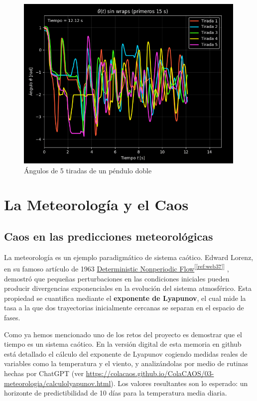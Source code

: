 \documentclass[
  10pt,
  a4paper,
  DIV=11,
  numbers=noendperiod,
  open=any]{scrreprt}
\numberwithin{equation}{chapter}
\numberwithin{equation}{section}
\renewcommand{\[}{\begin{equation}}
\renewcommand{\]}{\end{equation}}
\newcommand{\refweb}[3]{%
  \href{#1}{#2}\textsuperscript{[\ref{ref:#3}]}%
}
\begin{document}
\begin{figure}[h]
  \centering
  \includegraphics[width=0.99\textwidth]{02-pendulo-doble/theta_vs_time_doble.png}
  \caption{Ángulos de 5 tiradas de un péndulo doble}
\end{figure}


\part{La Meteorología y el Caos}

\chapter{Caos en las predicciones
meteorológicas}\label{caos-en-las-predicciones-meteoroluxf3gicas}

La meteorología es un ejemplo paradigmático de sistema caótico. Edward
Lorenz, en su famoso artículo de 1963 \refweb{https://journals.ametsoc.org/view/journals/atsc/20/2/1520-0469_1963_020_0130_dnf_2_0_co_2.xml}{Deterministic Nonperiodic Flow}{web37}, demostró que pequeñas
perturbaciones en las condiciones iniciales pueden producir divergencias
exponenciales en la evolución del sistema atmosférico.
Esta propiedad se cuantifica mediante el \textbf{exponente de Lyapunov},
el cual mide la tasa a la que dos trayectorias inicialmente cercanas se
separan en el espacio de fases.

Como ya hemos mencionado uno de los retos del proyecto es demostrar que
el tiempo es un sistema caótico. En la versión digital de esta memoria en github está detallado el cálculo del exponente de Lyapunov cogiendo medidas reales de
variables como la temperatura y el viento, y analizándolas por medio de
rutinas hechas por ChatGPT (ver \url{https://colacaos.github.io/ColaCAOS/03-meteorologia/calculolyapunov.html}). Los valores resultantes son lo esperado: un
horizonte de predictibilidad de 10 días para la temperatura media
diaria.
\end{document}
